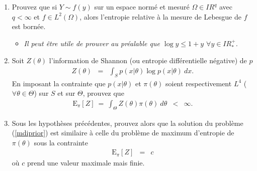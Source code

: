 \documentclass[10pt]{article}
\newcommand{\R}{I\!\!R}
\newcommand{\E}{\mbox{E}}
\newcommand{\1}{\mathbbm{1}}
\begin{document}
\begin{enumerate}
\item Prouvez que si $Y\sim f(y)$ sur un espace norm\'e et mesur\'e $\Omega\in\R^q$ avec $q<\infty$ et $f\in L^2(\Omega)$, alors l'entropie relative \`a la mesure de Lebesgue de $f$ est born\'ee. \\

\begin{itemize}
    \item {\it Il peut \^etre utile de prouver au pr\'ealable  que $\log y \leq 1 + y$ $\forall y\in \R^+_*$.} \\
\end{itemize}
\item Soit $Z(\theta)$ l'information de Shannon (ou entropie diff\'erentielle n\'egative) de $p$ 
\begin{eqnarray*}
Z(\theta) & = & \int_{S} p(x|\theta) \log p(x|\theta) \ dx.
\end{eqnarray*}
En imposant la contrainte que $p(x|\theta)$ et $\pi(\theta)$ soient respectivement $L^4$ ($\forall \theta\in\Theta$) sur $S$ et sur $\Theta$, prouvez que 
\begin{eqnarray*}
\E_{\pi}[Z] \ = \ \int_{\Theta} Z(\theta) \pi(\theta) \ d\theta & < & \infty.
\end{eqnarray*}
\item Sous les hypoth\`eses pr\'ec\'edentes, prouvez alors que la solution du probl\`eme  (\ref{mdiprior}) est similaire \`a celle du probl\`eme de maximum d'entropie de $\pi(\theta)$ sous la contrainte
\begin{eqnarray}
\E_{\pi}[Z] & = & c \label{contr2}
\end{eqnarray}
o\`u $c$ prend une valeur maximale mais finie. \\



\end{enumerate}
\end{document}
